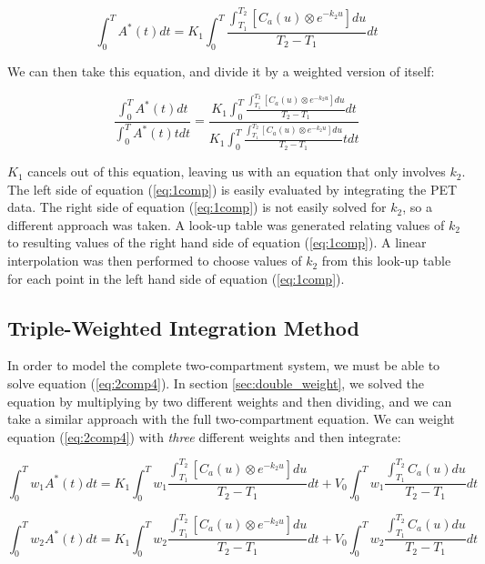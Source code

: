 \begin{equation}
\int_{0}^{T} A^{*}(t) dt = K_{1} \int_{0}^{T} \frac{\int_{T_1}^{T_2}
\left[ C_{a}(u) \otimes e^{-k_{2}u} \right] du}{T_2 - T_1} dt
\end{equation}

We can then take this equation, and divide it by a weighted version
of itself:

\begin{equation}
\frac{\int_{0}^{T} A^{*}(t) dt}{\int_{0}^{T} A^{*}(t) t dt} =
\frac{K_{1} \int_{0}^{T} \frac{\int_{T_1}^{T_2} \left[ C_{a}(u)
\otimes e^{-k_{2}u} \right] du}{T_2 - T_1} dt}{K_{1} \int_{0}^{T}
\frac{\int_{T_1}^{T_2} \left[ C_{a}(u) \otimes e^{-k_{2}u} \right]
du}{T_2 - T_1} t dt}
\label{eq:1comp}
\end{equation}

$K_{1}$ cancels out of this equation, leaving us with an equation
that only involves $k_{2}$.  The left side of equation
(\ref{eq:1comp}) is easily evaluated by integrating the PET data.
The right side of equation (\ref{eq:1comp}) is not easily solved for
$k_{2}$, so a different approach was taken.  A look-up table was
generated relating values of $k_{2}$ to resulting values of the
right hand side of equation (\ref{eq:1comp}).  A linear
interpolation was then performed to choose values of $k_{2}$ from
this look-up table for each point in the left hand side of equation
(\ref{eq:1comp}).


\subsection{Triple-Weighted Integration Method}

In order to model the complete two-compartment system, we must be able
to solve equation (\ref{eq:2comp4}).  In section
\ref{sec:double_weight},
we solved the equation by multiplying by two different weights and
then dividing, and we can take a similar approach with the full
two-compartment equation.  We can weight equation (\ref{eq:2comp4})
with {\em three} different weights and then integrate:

\begin{equation}
\int_{0}^{T} w_{1}A^{*}(t)dt = K_{1} \int_{0}^{T} w_{1}
\frac{\int_{T_1}^{T_2} \left[ C_{a}(u) \otimes e^{-k_{2}u} \right]
du}{T_2 - T_1} dt + V_{0} \int_{0}^{T}w_{1} \frac{\int_{T_1}^{T_2}
C_{a}(u) du}{T_2 - T_1} dt \label{eq:fullweight1}
\end{equation}

\begin{equation}
\int_{0}^{T} w_{2}A^{*}(t)dt = K_{1} \int_{0}^{T} w_{2}
\frac{\int_{T_1}^{T_2} \left[ C_{a}(u) \otimes e^{-k_{2}u} \right]
du}{T_2 - T_1} dt + V_{0} \int_{0}^{T}w_{2} \frac{\int_{T_1}^{T_2}
C_{a}(u) du}{T_2 - T_1} dt \label{eq:fullweight2}
\end{equation}

